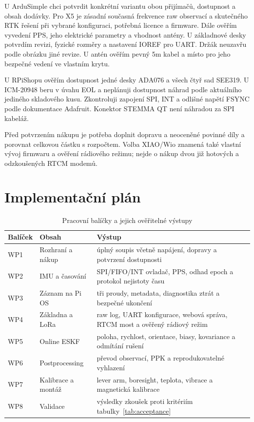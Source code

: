 U ArduSimple chci potvrdit konkrétní variantu obou přijímačů, dostupnost
a obsah dodávky. Pro X5 je zásadní současná frekvence raw observací a
skutečného RTK řešení při vybrané konfiguraci, potřebná licence a firmware.
Dále ověřím vyvedení PPS, jeho elektrické parametry a vhodnost antény.
U základnové desky potvrdím revizi, fyzické rozměry a nastavení IOREF
pro UART. Držák neuzavřu podle obrázku jiné revize. U antén ověřím pevný
5m kabel a místo pro jeho bezpečné vedení ve vlastním krytu.

U RPiShopu ověřím dostupnost jedné desky ADA076 a všech čtyř sad SEE319.
U ICM-20948 beru v úvahu EOL a neplánuji dostupnost náhrad podle aktuálního
jediného skladového kusu. Zkontroluji zapojení SPI, INT a odlišné napětí
FSYNC podle dokumentace Adafruit. Konektor STEMMA QT není náhradou za SPI
kabeláž.

Před potvrzením nákupu je potřeba doplnit dopravu a neoceněné povinné díly
a porovnat celkovou částku s rozpočtem. Volba XIAO/Wio znamená také vlastní
vývoj firmwaru a ověření rádiového režimu; nejde o nákup dvou již hotových
a odzkoušených RTCM modemů.

\section{Implementační plán}

\begin{table}[htbp]
  \centering
  \small
  \caption{Pracovní balíčky a jejich ověřitelné výstupy}
  \label{tab:plan}
  \begin{tabularx}{\textwidth}{@{}L{0.10\textwidth}L{0.29\textwidth}Y@{}}
    \toprule
    Balíček & Obsah & Výstup \\
    \midrule
    WP1 & Rozhraní a nákup & úplný soupis včetně napájení, dopravy a potvrzení dostupnosti \\
    WP2 & IMU a časování & SPI/FIFO/INT ovladač, PPS, odhad epoch a protokol nejistoty času \\
    WP3 & Záznam na Pi OS & tři proudy, metadata, diagnostika ztrát a bezpečné ukončení \\
    WP4 & Základna a LoRa & raw log, UART konfigurace, webová správa, RTCM most a ověřený rádiový režim \\
    WP5 & Online ESKF & poloha, rychlost, orientace, biasy, kovariance a odmítání rušení \\
    WP6 & Postprocessing & převod observací, PPK a reprodukovatelné vyhlazení \\
    WP7 & Kalibrace a montáž & lever arm, boresight, teplota, vibrace a magnetická kalibrace \\
    WP8 & Validace & výsledky zkoušek proti kritériím tabulky~\ref{tab:acceptance} \\
    \bottomrule
  \end{tabularx}
\end{table}

